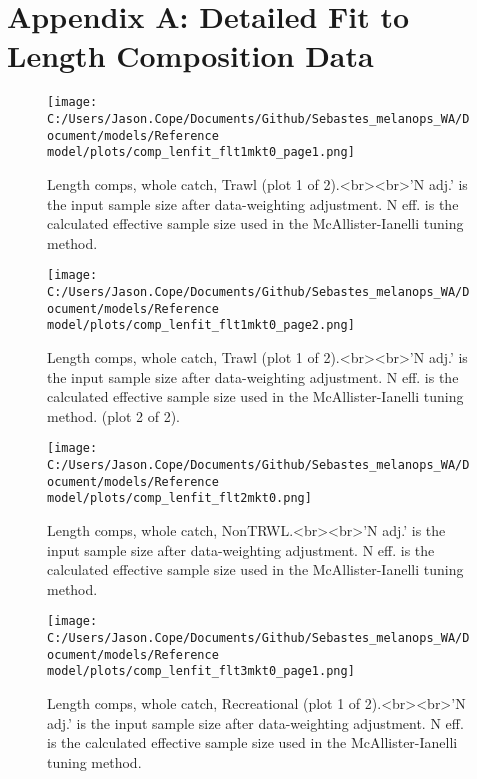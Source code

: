 \documentclass[11pt,
  letterpaper,
]{article}
\begin{document}
\newpage

\clearpage

\hypertarget{app-a}{%
\section{Appendix A: Detailed Fit to Length Composition Data}\label{app-a}}

\begin{figure}
{\centering
\texttt{[image: C:/Users/Jason.Cope/Documents/Github/Sebastes\_melanops\_WA/Document/models/Reference model/plots/comp\_lenfit\_flt1mkt0\_page1.png]}
}
\caption{Length comps, whole catch, Trawl (plot 1 of 2).<br><br>'N adj.' is the input sample size after data-weighting adjustment. N eff. is the calculated effective sample size used in the McAllister-Ianelli tuning method.\label{fig:comp_lenfit_flt1mkt0_page1}}
\end{figure}

\begin{figure}
{\centering
\texttt{[image: C:/Users/Jason.Cope/Documents/Github/Sebastes\_melanops\_WA/Document/models/Reference model/plots/comp\_lenfit\_flt1mkt0\_page2.png]}
}
\caption{Length comps, whole catch, Trawl (plot 1 of 2).<br><br>'N adj.' is the input sample size after data-weighting adjustment. N eff. is the calculated effective sample size used in the McAllister-Ianelli tuning method. (plot 2 of 2).\label{fig:comp_lenfit_flt1mkt0_page2}}
\end{figure}

\begin{figure}
{\centering
\texttt{[image: C:/Users/Jason.Cope/Documents/Github/Sebastes\_melanops\_WA/Document/models/Reference model/plots/comp\_lenfit\_flt2mkt0.png]}
}
\caption{Length comps, whole catch, NonTRWL.<br><br>'N adj.' is the input sample size after data-weighting adjustment. N eff. is the calculated effective sample size used in the McAllister-Ianelli tuning method.\label{fig:comp_lenfit_flt2mkt0}}
\end{figure}

\begin{figure}
{\centering
\texttt{[image: C:/Users/Jason.Cope/Documents/Github/Sebastes\_melanops\_WA/Document/models/Reference model/plots/comp\_lenfit\_flt3mkt0\_page1.png]}
}
\caption{Length comps, whole catch, Recreational (plot 1 of 2).<br><br>'N adj.' is the input sample size after data-weighting adjustment. N eff. is the calculated effective sample size used in the McAllister-Ianelli tuning method.\label{fig:comp_lenfit_flt3mkt0_page1}}
\end{figure}
\end{document}
